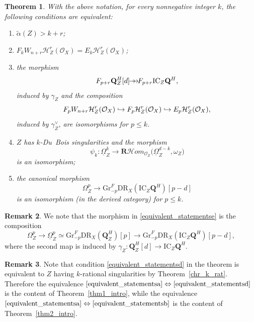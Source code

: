\documentclass[JEP,XML,SOM,Unicode]{cedram}
\newcommand\hto{\mathrel{\lhook\joinrel\to}}
\newcommand{\onto}{\mathchoice{\to\hspace*{-5mm}\to}{\to\hspace*{-2.85mm}\to}{\to\hspace*{-3mm}\to}{\to\hspace*{-3mm}\to}}
\theoremstyle{plain}
\newtheorem{thm}{Theorem}[section]
\theoremstyle{definition}
\newtheorem{rmk}[thm]{Remark}
\newcommand\Q{{\mathbf Q}}
\newcommand\R{{\mathbf R}}
\newcommand\cH{\mathcal{H}}
\newcommand\cO{\mathcal{O}}
\newcommand\cH{\mathcal{H}}
\newcommand\cO{\mathcal{O}}
\newcommand\gr{\mathrm{Gr}}
\newcommand\DR{\mathrm{DR}}
\begin{document}
\begin{thm}\label{equivalent_statements}
With the above notation, for every nonnegative integer $k$, the following conditions are equivalent:
\begin{enumerate}
\item\label{equivalent_statementsa} $\widetilde \alpha(Z)>k+r$;
\item\label{equivalent_statementsb}$F_kW_{n+r}\cH^r_Z(\cO_X)=E_k\cH^r_Z(\cO_X)$;
\item\label{equivalent_statementsc} the morphism
\begin{equation}\label{eqn1_equivalent_statements}
F_{p+r}\Q_Z^H[d]\onto F_{p+r}\mathrm{IC}_Z\Q^H,
\end{equation}
induced by $\gamma_Z$ and the composition
\begin{equation}\label{eqn2_equivalent_statements}
F_pW_{n+r}\cH^r_Z(\cO_X)\hto F_p\cH^r_Z(\cO_X)\hto E_p\cH^r_Z(\cO_X),
\end{equation}
induced by $\gamma_Z^{\vee}$, are isomorphisms for $p\leq k$.
\item\label{equivalent_statementsd} $Z$ has $k$-Du~Bois singularities and the morphism
\[
\psi_k\colon \underline{\Omega}_{Z}^k\to \R\cH om_{\cO_{Z}}\big(\underline{\Omega}_{Z}^{d-k},\omega_{Z}\big)
\]
is an isomorphism;
\item\label{equivalent_statementse} the canonical morphism
\[
\Omega^p_Z \to \gr^F_{-p}\DR_X(\mathrm{IC}_Z\Q^H)[p-d]
\]
is an isomorphism (in the derived category) for $p \leq k$.
\end{enumerate}
\end{thm}

\begin{rmk}\label{rmk_van_lci}
We note that the morphism in \eqref{equivalent_statementse} is the composition
\[\Omega_Z^p\to \underline{\Omega}_Z^p\simeq \gr^F_{-p}\DR_X(\Q_Z^H)[p]\to
\gr^F_{-p}\DR_X(\mathrm{IC}_Z\Q^H)[p-d],\]
where the second map is induced by $\gamma_Z\colon \Q_Z^H[d]\to \mathrm{IC}_Z\Q^H$.
\end{rmk}

\begin{rmk}
Note that condition
\eqref{equivalent_statementsd} in the theorem is equivalent to $Z$ having $k$-rational singularities
by Theorem~\ref{chr_k_rat}. Therefore the equivalence $\eqref{equivalent_statementsa}\Leftrightarrow\eqref{equivalent_statementsd}$ is the content of Theorem~\ref{thm1_intro},
while the equivalence $\eqref{equivalent_statementsa}\Leftrightarrow\eqref{equivalent_statementsb}$ is the content of Theorem~\ref{thm2_intro}.
\end{rmk}
\end{document}

